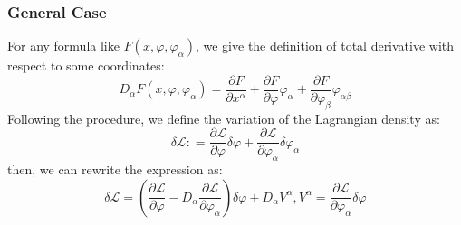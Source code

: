\documentclass{article}
\begin{document}
\subsubsection{General Case}
For any formula like $F \left( x , \varphi , \varphi _ { \alpha } \right)$, we give the definition of total derivative with respect to some coordinates:
\begin{equation}
    D _ { \alpha } F \left( x , \varphi , \varphi _ { \alpha } \right) = \frac { \partial F } { \partial x ^ { \alpha } } + \frac { \partial F } { \partial \varphi } \varphi _ { \alpha } + \frac { \partial F } { \partial \varphi _ { \beta } } \varphi _ { \alpha \beta }
\end{equation}
Following the procedure, we define the variation of the Lagrangian density as:
\begin{equation}
    \delta \mathcal { L } : = \frac { \partial \mathcal { L } } { \partial \varphi } \delta \varphi + \frac { \partial \mathcal { L } } { \partial \varphi _ { \alpha } } \delta \varphi _ { \alpha }
\end{equation}
then, we can rewrite the expression as:
\begin{equation}
    \delta \mathcal { L } = \left( \frac { \partial \mathcal { L } } { \partial \varphi } - D _ { \alpha } \frac { \partial \mathcal { L } } { \partial \varphi _ { \alpha } } \right) \delta \varphi + D _ { \alpha } V ^ { \alpha }, V ^ { \alpha } = \frac { \partial \mathcal { L } } { \partial \varphi _ { \alpha } } \delta \varphi
\end{equation}
\end{document}
